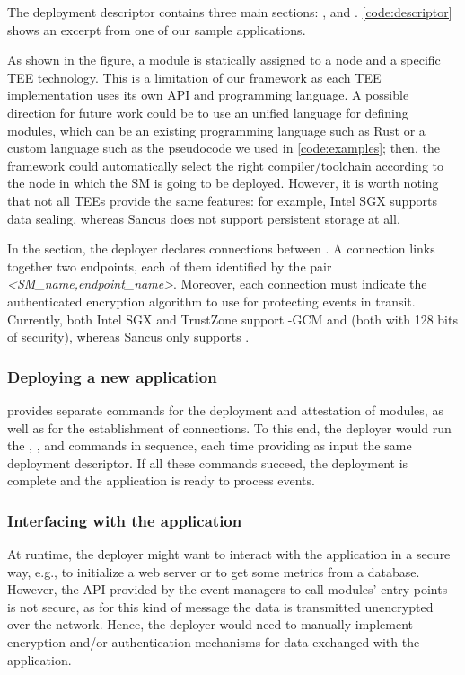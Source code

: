 The deployment descriptor contains three main sections: ,
 and . \cref{code:descriptor} shows an excerpt
from one of our sample applications. 

As shown in the figure, a module is statically assigned to a node and a specific
\ac{TEE} technology. This is a limitation of our framework as each \ac{TEE}
implementation uses its own API and programming language. A possible direction
for future work could be to use an unified language for defining modules, which
can be an existing programming language such as Rust or a custom language such
as the pseudocode we used in \cref{code:examples}; then, the framework could
automatically select the right compiler/toolchain according to the node in which
the \ac{SM} is going to be deployed. However, it is worth noting that not all
\acp{TEE} provide the same features: for example, Intel \ac{SGX} supports data
sealing, whereas Sancus does not support persistent storage at all.

In the  section, the deployer declares connections between
\protmods. A connection links together two endpoints, each of them identified by
the pair \emph{<SM\_name,endpoint\_name>}. Moreover, each connection must
indicate the authenticated encryption algorithm to use for protecting events in
transit. Currently, both Intel \ac{SGX} and TrustZone support \aes-\ac{GCM} and
\spongent{} (both with 128 bits of security), whereas Sancus only supports
\spongent{}.

\subsubsection{Deploying a new application}

\reactools{} provides separate commands for the deployment and attestation of
modules, as well as for the establishment of connections. To this end, the
deployer would run the , , and  commands in
sequence, each time providing as input the same deployment descriptor. If all
these commands succeed, the deployment is complete and the application is ready
to process events.

\subsubsection{Interfacing with the application}
%
\label{impl-descriptor-interfacing}

At runtime, the deployer might want to interact with the application in a secure
way, e.g., to initialize a web server or to get some metrics from a database.
However, the \callentry{} API provided by the event managers to call modules'
entry points is not secure, as for this kind of message the data is transmitted
unencrypted over the network. Hence, the deployer would need to manually
implement encryption and/or authentication mechanisms for data exchanged with
the application.


